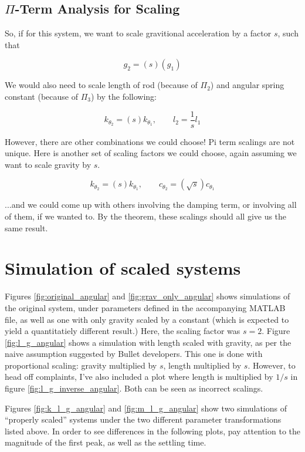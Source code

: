 \documentclass[12pt,letterpaper]{article}
\begin{document}
\subsection{$\Pi$-Term Analysis for Scaling}

So, if for this system, we want to scale gravitional acceleration by a factor $s$, such that

\[
g_2 = (s) (g_1)
\]

We would also need to scale length of rod (because of $\Pi_2$) and angular spring constant (because of $\Pi_3$) by the following:

\[
k_{\theta_2} = (s) k_{\theta_1}, \quad \quad l_2 = \frac{1}{s} l_1
\]

However, there are other combinations we could choose! Pi term scalings are not unique. Here is another set of scaling factors we could choose, again assuming we want to scale gravity by $s$.

\[
k_{\theta_2} = (s) k_{\theta_1}, \quad \quad c_{\theta_2} = (\sqrt{s}) c_{\theta_1}
\]

...and we could come up with others involving the damping term, or involving all of them, if we wanted to. By the theorem, these scalings should all give us the same result.

\section{Simulation of scaled systems}

Figures \ref{fig:original_angular} and \ref{fig:grav_only_angular} shows simulations of the original system, under parameters defined in the accompanying MATLAB file, as well as one with only gravity scaled by a constant (which is expected to yield a quantitatiely different result.)
Here, the scaling factor was $s=2$.
Figure \ref{fig:l_g_angular} shows a simulation with length scaled with gravity, as per the naive assumption suggested by Bullet developers.
This one is done with proportional scaling: gravity multiplied by $s$, length multiplied by $s$.
However, to head off complaints, I've also included a plot where length is multiplied by $1/s$ in figure \ref{fig:l_g_inverse_angular}.
Both can be seen as incorrect scalings.

Figures \ref{fig:k_l_g_angular} and \ref{fig:m_l_g_angular} show two simulations of ``properly scaled'' systems under the two different parameter transformations listed above.
In order to see differences in the following plots, pay attention to the magnitude of the first peak, as well as the settling time.
\end{document}
